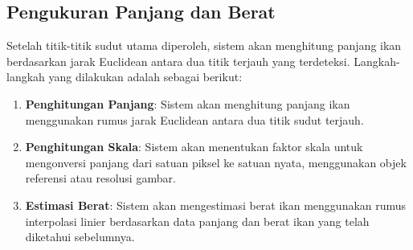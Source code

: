 \subsection{Pengukuran Panjang dan Berat}
    Setelah titik-titik sudut utama diperoleh, sistem akan menghitung panjang ikan berdasarkan jarak Euclidean antara dua titik terjauh yang terdeteksi. Langkah-langkah yang dilakukan adalah sebagai berikut:
\begin{enumerate}
    \setlength{\parskip}{0pt}
    \item \textbf{Penghitungan Panjang}: Sistem akan menghitung panjang ikan menggunakan rumus jarak Euclidean antara dua titik sudut terjauh.
    \item \textbf{Penghitungan Skala}: Sistem akan menentukan faktor skala untuk mengonversi panjang dari satuan piksel ke satuan nyata, menggunakan objek referensi atau resolusi gambar.
    \item \textbf{Estimasi Berat}: Sistem akan mengestimasi berat ikan menggunakan rumus interpolasi linier berdasarkan data panjang dan berat ikan yang telah diketahui sebelumnya.
\end{enumerate}
